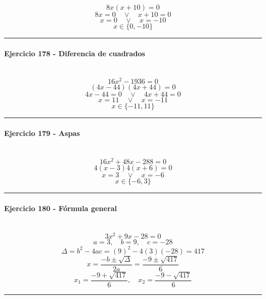 \documentclass[10pt,a4paper]{article}
\newcommand{\res}[1]{\paragraph{#1}\mbox{}\\[-1.2em]}
\begin{document}
\[ 8x(x+10)=0 \]
\[ 8x=0 \quad \vee \quad x+10=0 \]
\[ x=0 \quad \vee \quad x=-10 \]
\[ \boxed{x\in\{0,-10\}} \]
\vspace{1mm}\hrule\vspace{2mm}
\res{Ejercicio 178 - Diferencia de cuadrados}
\[ 16 x^{2} - 1936=0 \]
\[ (4x-44)(4x+44)=0 \]
\[ 4x-44=0 \quad \vee \quad 4x+44=0 \]
\[ x=11 \quad \vee \quad x=-11 \]
\[ \boxed{x\in\{-11,11\}} \]
\vspace{1mm}\hrule\vspace{2mm}
\res{Ejercicio 179 - Aspas}
\[ 16 x^{2} + 48 x - 288=0 \]
\[ 4(x-3)4(x+6)=0 \]
\[ x=3 \quad \vee \quad x=-6 \]
\[ \boxed{x\in\{-6,3\}} \]
\vspace{1mm}\hrule\vspace{2mm}
\res{Ejercicio 180 - Fórmula general}
\[ 3 x^{2} + 9 x - 28=0 \]
\[ a=3,\quad b=9,\quad c=-28 \]
\[ \Delta=b^2-4ac=(9)^2-4(3)(-28)=417 \]
\[ x=\frac{-b\pm\sqrt{\Delta}}{2a}=\frac{-9\pm\sqrt{417}}{6} \]
\[ \boxed{x_1=\frac{-9+\sqrt{417}}{6},\quad x_2=\frac{-9-\sqrt{417}}{6}} \]
\vspace{1mm}\hrule\vspace{2mm}
\end{document}
